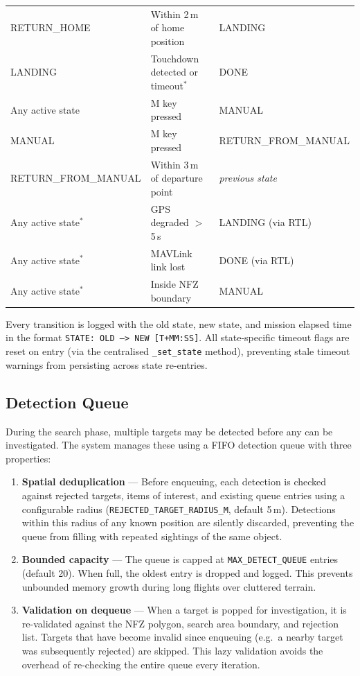 \begin{table}[htbp]
\begin{tabular}{lll}
RETURN\_HOME & Within 2\,m of home position & LANDING \\
LANDING & Touchdown detected or timeout$^*$ & DONE \\
\midrule
Any active state & M key pressed & MANUAL \\
MANUAL & M key pressed & RETURN\_FROM\_MANUAL \\
RETURN\_FROM\_MANUAL & Within 3\,m of departure point & \textit{previous state} \\
Any active state$^*$ & GPS degraded $>$ 5\,s & LANDING (via RTL) \\
Any active state$^*$ & MAVLink link lost & DONE (via RTL) \\
Any active state$^*$ & Inside NFZ boundary & MANUAL \\
\bottomrule
\end{tabular}
\end{table}

Every transition is logged with the old state, new state, and mission elapsed time in the format \texttt{STATE: OLD --> NEW [T+MM:SS]}. All state-specific timeout flags are reset on entry (via the centralised \texttt{\_set\_state} method), preventing stale timeout warnings from persisting across state re-entries.

\subsection{Detection Queue}\label{subsec:queue}

During the search phase, multiple targets may be detected before any can be investigated. The system manages these using a FIFO detection queue with three properties:

\begin{enumerate}
    \item \textbf{Spatial deduplication} --- Before enqueuing, each detection is checked against rejected targets, items of interest, and existing queue entries using a configurable radius (\texttt{REJECTED\_TARGET\_RADIUS\_M}, default 5\,m). Detections within this radius of any known position are silently discarded, preventing the queue from filling with repeated sightings of the same object.
    \item \textbf{Bounded capacity} --- The queue is capped at \texttt{MAX\_DETECT\_QUEUE} entries (default 20). When full, the oldest entry is dropped and logged. This prevents unbounded memory growth during long flights over cluttered terrain.
    \item \textbf{Validation on dequeue} --- When a target is popped for investigation, it is re-validated against the NFZ polygon, search area boundary, and rejection list. Targets that have become invalid since enqueuing (e.g.\ a nearby target was subsequently rejected) are skipped. This lazy validation avoids the overhead of re-checking the entire queue every iteration.
\end{enumerate}

